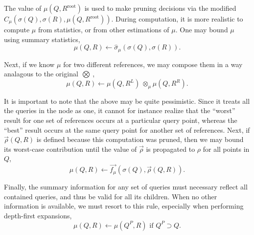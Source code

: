 \documentclass[times, leqno,twocolumn]{article}
\newcommand{\authornote}[1]{\footnote{Note to self: #1}}
\newcommand{\summary}{\hat{\sigma}}
\newcommand{\kdroot}[1]{#1^{\text{root}}}
\newcommand{\kdleft}[1]{#1^{\!L}}
\newcommand{\kdright}[1]{#1^{\!R}}
\newcommand{\kdparent}[1]{#1^{\!P}}
\newcommand{\nameOp}[2]{\mathop{#1\nolimits\!\!_{#2}}}
\newcommand{\nameop}[2]{{\scriptstyle\:}#1_{\!#2}}
\newcommand{\myOp}[1]{\nameOp{\bigotimes}{#1}}
\newcommand{\myop}[1]{\nameop{\otimes}{#1}}
\newcommand{\letterqr}{\rho}
\newcommand{\inqr}{\rho}
\newcommand{\Opqr}{\myOp{\letterqr}}
\newcommand{\inqrv}{\vec{\rho}}
\newcommand{\lettermu}{\mu}
\newcommand{\inmu}{\mu}
\newcommand{\opmu}{\myop{\lettermu}}
\newcommand{\fmuv}{\vec{f_{\!\lettermu}}}
\newcommand{\deltamu}{\summary_{\!\lettermu}}
\newcommand{\canprunemu}{C_{\!\lettermu}}
\newcommand{\outstat}{\sigma}
\begin{document}
\noindent The value of $\inmu(Q, \kdroot{R})$ is used to make pruning decisions via the modified $\canprunemu(\outstat(Q), \outstat(R), \inmu(Q, \kdroot{R}))$.
During computation, it is more realistic to compute $\inmu$ from statistics, or from other estimations of $\inmu$.
One may bound $\inmu$ using summary statistics,
\begin{equation*}
\inmu(Q, R) \gets \deltamu(\outstat(Q), \outstat(R)).
\label{eqn:approxmu}
\end{equation*}

\noindent Next, if we know $\inmu$ for two different references, we may compose them in a way analagous to the original $\Opqr$,
\begin{equation*}
\inmu(Q, R) \gets \inmu(Q, \kdleft{R}) \opmu \inmu(Q, \kdright{R}).
\label{eqn:combinemu}
\end{equation*}

\noindent It is important to note that the above may be quite pessimistic.
Since it treats all the queries in the node as one, it cannot for instance realize that the ``worst'' result for one set of references occurs at a particular query point, whereas the ``best'' result occurs at the same query point for another set of references.
Next, if $\inqrv(Q, R)$ is defined because this computation was pruned, then we may bound its worst-case contribution until the value of $\inqrv$ is propagated to $\inqr$ for all points in $Q$,
\begin{equation*}
\inmu(Q, R) \gets \fmuv(\outstat(Q), \inqrv(Q, R)).
\label{eqn:pimu}
\end{equation*}

\noindent 
Finally, the summary information for any set of queries must necessary reflect all contained queries, and thus be valid for all its children.
When no other information is available, we must resort to this rule, especially when performing depth-first expansions,
\begin{equation*}
\inmu(Q, R) \gets \inmu(\kdparent{Q}, R) \text{ if } \kdparent{Q} \supset Q.
\end{equation*}
\end{document}
